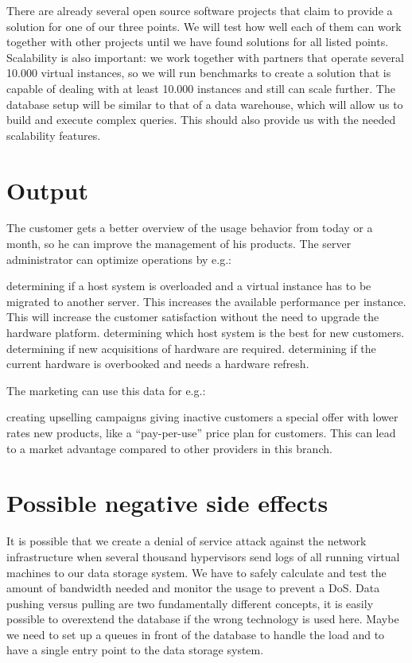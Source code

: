 There are already several open source software projects that claim to provide a
solution for one of our three points. We will test how well each of them can
work together with other projects until we have found solutions for all listed
points. Scalability is also important: we work together with partners that
operate several 10.000 virtual instances, so we will run benchmarks to create a
solution that is capable of dealing with at least 10.000 instances and still can
scale further. The database setup will be similar to that of a data warehouse,
which will allow us to build and execute complex queries. This should also
provide us with the needed scalability features.

\section{Output}

The customer gets a better overview of the usage behavior from today or a
month, so he can improve the management of his products. The server
administrator can optimize operations by e.g.:
\begin{outline}
  \1 determining if a host system is overloaded and a virtual instance has to
  be migrated to another server. This increases the available performance per
  instance. This will increase the customer satisfaction without the need to
  upgrade the hardware platform.
  \1 determining which host system is the best for new customers.
  \1 determining if new acquisitions of hardware are required.
  \1 determining if the current hardware is overbooked and needs a hardware
  refresh.
\end{outline}

The marketing can use this data for e.g.:
\begin{outline}
  \1 creating upselling campaigns
  \1 giving inactive customers a special offer with lower rates
  \1 new products, like a “pay-per-use” price plan for customers. This can lead
  to a market advantage compared to other providers in this branch.
\end{outline}

\section{Possible negative side effects}

It is possible that we create a denial of service attack against the network
infrastructure when several thousand hypervisors send logs of all running
virtual machines to our data storage system. We have to safely calculate and
test the amount of bandwidth needed and monitor the usage to prevent a DoS.
Data pushing versus pulling are two fundamentally different concepts, it is
easily possible to overextend the database if the wrong technology is used
here. Maybe we need to set up a queues in front of the database to handle the
load and to have a single entry point to the data storage system.


